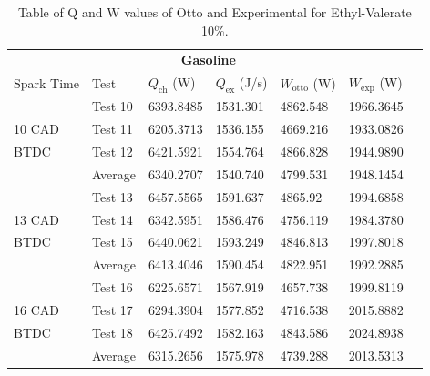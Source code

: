\documentclass[11pt]{article}
\begin{document}
\begin{table}[H]
	\begin{center}
	\begin{tabular}{@{}l l l l l l l@{}}
		\toprule
		\multicolumn{6}{c}{\textbf{Gasoline}} \\
		Spark Time & Test & $Q_\textrm{ch}$ (W) & $Q_\textrm{ex}$ (J/s) & $W_\textrm{otto}$ (W) & $W_\textrm{exp}$ (W) \\ 
		\midrule
				& Test 10  	& 6393.8485 & 1531.301 & 4862.548 & 1966.3645\\
		10 CAD	& Test 11 	& 6205.3713 & 1536.155 & 4669.216 & 1933.0826\\
		BTDC	& Test 12 	& 6421.5921 & 1554.764 & 4866.828 & 1944.9890\\
				& Average 	& 6340.2707 & 1540.740 & 4799.531 & 1948.1454\\
				& Test 13 	& 6457.5565 & 1591.637 & 4865.92 & 1994.6858\\
		13 CAD	& Test 14 	& 6342.5951 & 1586.476 & 4756.119 & 1984.3780\\
		BTDC	& Test 15 	& 6440.0621 & 1593.249 & 4846.813 & 1997.8018\\
				& Average	& 6413.4046 & 1590.454 & 4822.951 & 1992.2885\\	
				& Test 16  	& 6225.6571 & 1567.919 & 4657.738 & 1999.8119\\
		16 CAD	& Test 17 	& 6294.3904 & 1577.852 & 4716.538 & 2015.8882\\
		BTDC	& Test 18 	& 6425.7492 & 1582.163 & 4843.586 & 2024.8938\\
				& Average	& 6315.2656 & 1575.978 & 4739.288 & 2013.5313\\		
		\bottomrule
	\end{tabular}
	\caption{Table of Q and W values of Otto and Experimental for Ethyl-Valerate 10\%.}
	\label{q4-t5}
	\end{center}
\end{table}
\end{document}
